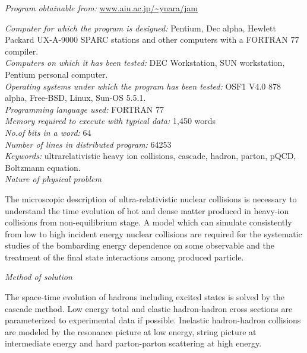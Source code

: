 \documentclass[]{article}
\begin{document}

{\noindent\em Program obtainable from:}
\url{www.aiu.ac.jp/~ynara/jam}


{\noindent\em Computer for which the program is designed:}
 Pentium, Dec alpha, Hewlett Packard UX-A-9000  SPARC stations
and other computers with a FORTRAN 77 compiler.\\


{\noindent\em Computers on which it has been tested:}
  DEC Workstation,  SUN workstation, Pentium personal computer.\\

{\noindent\em Operating systems under which the program has been tested:}
OSF1 V4.0 878 alpha, Free-BSD, Linux, Sun-OS 5.5.1.\\

{\noindent\em Programming language used:} FORTRAN 77\\

{\noindent\em Memory required to execute with typical data:} 1,450 words\\ 

{\noindent\em No.of bits in a word:} 64\\

{\noindent\em Number of lines in distributed program:} 64253\\

{\noindent\em Keywords:} ultrarelativistic heavy ion collisions,
cascade, hadron, parton, pQCD, Boltzmann equation. \\


{\noindent\em Nature of physical problem}

\noindent
The microscopic description of ultra-relativistic nuclear collisions
is necessary to understand the time evolution of 
hot and dense matter produced in heavy-ion collisions
 from non-equilibrium stage.
A model which can simulate consistently 
 from low to high incident energy nuclear collisions
 are required for the
systematic studies of the bombarding energy dependence on some observable
and the treatment of the final state interactions among produced particle.

\bigskip

{\noindent\em Method of solution}

\noindent
 The space-time evolution of hadrons including 
 excited states
is solved by the cascade method.
Low energy total and elastic hadron-hadron cross sections
 are parameterized to experimental data if possible.
Inelastic hadron-hadron collisions are modeled by the resonance
picture at low energy,
string picture at intermediate energy
and hard parton-parton scattering at high energy.
\end{document}
